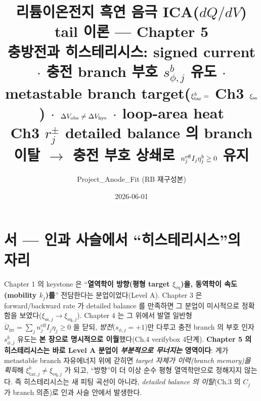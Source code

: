 \documentclass[11pt,a4paper]{article}
\title{\textbf{리튬이온전지 흑연 음극 ICA($dQ/dV$) tail 이론 — Chapter 5}\\[0.4em]
\large 충방전과 히스테리시스: signed current $\cdot$ 충전 branch 부호 $s_{\phi,j}^b$ 유도 $\cdot$\\
metastable branch target($\xi_\tar^b=$ Ch3 $\xi_\sstat$) $\cdot$ $\Delta V_{\mathrm{obs}}\ne\Delta V_{\mathrm{hys}}$ $\cdot$ loop-area heat\\[0.2em]
\normalsize Ch3 $r_j^\pm$ detailed balance 의 branch 이탈 $\to$ 충전 부호 상쇄로 $n_j^{\eff}I_j\eta_j^b\ge0$ 유지}
\author{Project\_Anode\_Fit (RB 재구성본)}
\date{2026-06-01}
\newcommand{\eff}{\mathrm{eff}}
\newcommand{\eq}{\mathrm{eq}}
\newcommand{\irr}{\mathrm{irr}}
\newcommand{\tar}{\mathrm{tar}}
\newcommand{\sstat}{\mathrm{ss}}
\begin{document}
\sloppy
\maketitle

\section*{서 — 인과 사슬에서 ``히스테리시스''의 자리}
Chapter 1 의 keystone 은 ``\textbf{열역학이 방향(평형 target $\xi_{\eq}$)을, 동역학이 속도(mobility $k_j$)를}''
전담한다는 분업이었다(Level A). Chapter 3 은 forward/backward rate 가 detailed balance 를 만족하면 그 분업이
미시적으로 정확함을 보였다($\xi_{\sstat,j}\to\xi_{\eq,j}$). Chapter 4 는 그 위에서 발열 일반형
$\dot{\mathcal Q}_\irr=\sum_j n_j^{\eff}I_j\eta_j\ge0$ 을 닫되, \emph{방전}($s_{\phi,j}=+1$)만 다루고 충전
branch 의 부호 인자 $s_{\phi,j}^b$ 유도는 \textbf{본 장으로 명시적으로 이월}했다(Ch.4 verifybox 4단계).
\textbf{Chapter 5 의 히스테리시스는 바로 Level A 분업이 \emph{부분적으로 무너지는} 영역이다}: 계가 metastable
branch 자유에너지 위에 갇히면 \emph{target 자체가 이력(branch memory)을 획득}해 $\xi_{\tar,j}^b\ne\xi_{\eq,j}$
가 되고, ``방향''이 더 이상 순수 평형 열역학만으로 정해지지 않는다. 즉 히스테리시스는 새 피팅 곡선이 아니라,
\emph{detailed balance 의 이탈}(Ch.3 의 $C_j$ 가 branch 의존)로 인과 사슬 안에서 발생한다.
\end{document}
